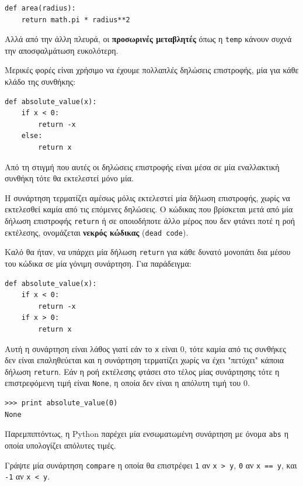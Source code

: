 \documentclass[10pt]{book}
\begin{document}
\begin{verbatim}
def area(radius):
    return math.pi * radius**2
\end{verbatim}
%

Αλλά από την άλλη πλευρά, οι {\bf προσωρινές μεταβλητές} όπως η {\tt temp} 
κάνουν συχνά την αποσφαλμάτωση ευκολότερη.

Μερικές φορές είναι χρήσιμο να έχουμε πολλαπλές δηλώσεις επιστροφής, μία για κάθε κλάδο της συνθήκης:

\begin{verbatim}
def absolute_value(x):
    if x < 0:
        return -x
    else:
        return x
\end{verbatim}
%

Από τη στιγμή που αυτές οι δηλώσεις επιστροφής είναι μέσα σε μία εναλλακτική συνθήκη τότε θα εκτελεστεί μόνο μία.

Η συνάρτηση τερματίζει αμέσως μόλις εκτελεστεί μία δήλωση επιστροφής, χωρίς να εκτελεσθεί καμία από τις επόμενες δηλώσεις. Ο κώδικας που βρίσκεται μετά από μία δήλωση επιστροφής {\tt return} ή σε οποιοδήποτε άλλο μέρος που δεν φτάνει ποτέ η ροή εκτέλεσης, ονομάζεται {\bf νεκρός κώδικας} ({\tt dead code}).

Καλό θα ήταν, να υπάρχει μία δήλωση {\tt return} για κάθε δυνατό μονοπάτι δια μέσου του κώδικα σε μία γόνιμη συνάρτηση. Για παράδειγμα:

\begin{verbatim}
def absolute_value(x):
    if x < 0:
        return -x
    if x > 0:
        return x
\end{verbatim}
%

Αυτή η συνάρτηση είναι λάθος γιατί εάν το {\tt x} είναι 0, τότε
καμία από τις συνθήκες δεν είναι επαληθεύεται και η συνάρτηση τερματίζει
χωρίς να έχει "πετύχει" κάποια δήλωση {\tt return}. 
Εάν η ροή εκτέλεσης φτάσει στο τέλος μίας συνάρτησης τότε η επιστρεφόμενη τιμή είναι {\tt None}, η οποία δεν είναι η απόλυτη τιμή του 0.

\begin{verbatim}
>>> print absolute_value(0)
None
\end{verbatim}
%

Παρεμπιπτόντως, η Python παρέχει μία ενσωματωμένη συνάρτηση με
όνομα {\tt abs} η οποία υπολογίζει απόλυτες τιμές.

\begin{exercise}

Γράψτε μία συνάρτηση  {\tt compare}  η
οποία θα επιστρέφει  {\tt 1}  αν  {\tt x > y},
{\tt 0}  αν  {\tt x == y},   και  {\tt -1}  αν  {\tt x < y}.
\end{exercise}
\end{document}
